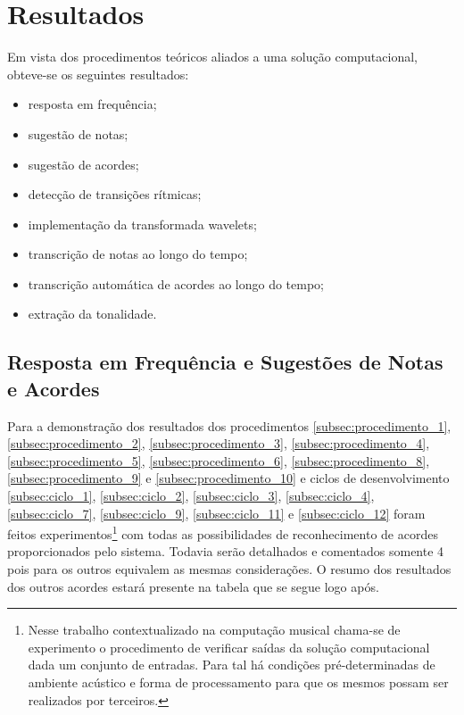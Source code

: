 \chapter{Resultados}
\label{chap:resultados}

Em vista dos procedimentos teóricos aliados a uma solução computacional, obteve-se os seguintes resultados:
\begin{itemize}
    \item resposta em frequência;
    \item sugestão de notas;
    \item sugestão de acordes;
    \item detecção de transições rítmicas;
    \item implementação da transformada wavelets;
    \item transcrição de notas ao longo do tempo;
    \item transcrição automática de acordes ao longo do tempo;
    \item extração da tonalidade.
\end{itemize}


\section{Resposta em Frequência e Sugestões de Notas e Acordes}
\label{sec:resposta}

Para a demonstração dos resultados dos procedimentos \ref{subsec:procedimento_1}, \ref{subsec:procedimento_2}, \ref{subsec:procedimento_3}, \ref{subsec:procedimento_4}, \ref{subsec:procedimento_5}, \ref{subsec:procedimento_6}, \ref{subsec:procedimento_8}, \ref{subsec:procedimento_9} e \ref{subsec:procedimento_10} e ciclos de desenvolvimento \ref{subsec:ciclo_1}, \ref{subsec:ciclo_2}, \ref{subsec:ciclo_3}, \ref{subsec:ciclo_4}, \ref{subsec:ciclo_7}, \ref{subsec:ciclo_9}, \ref{subsec:ciclo_11} e \ref{subsec:ciclo_12} foram feitos experimentos\footnote{Nesse trabalho contextualizado na computação musical chama-se de experimento o procedimento de verificar saídas da solução computacional dada um conjunto de entradas. Para tal há condições pré-determinadas de ambiente acústico e forma de processamento para que os mesmos possam ser realizados por terceiros.} com todas as possibilidades de reconhecimento de acordes proporcionados pelo sistema. Todavia serão detalhados e comentados somente 4 pois para os outros equivalem as mesmas considerações. O resumo dos resultados dos outros acordes estará presente na tabela que se segue logo após.


